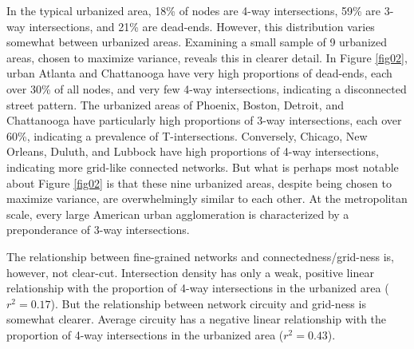 \documentclass{article}
\begin{document}
In the typical urbanized area, 18\% of nodes are 4-way intersections, 59\% are 3-way intersections, and 21\% are dead-ends. However, this distribution varies somewhat between urbanized areas. Examining a small sample of 9 urbanized areas, chosen to maximize variance, reveals this in clearer detail. In Figure \ref{fig02}, urban Atlanta and Chattanooga have very high proportions of dead-ends, each over 30\% of all nodes, and very few 4-way intersections, indicating a disconnected street pattern. The urbanized areas of Phoenix, Boston, Detroit, and Chattanooga have particularly high proportions of 3-way intersections, each over 60\%, indicating a prevalence of T-intersections. Conversely, Chicago, New Orleans, Duluth, and Lubbock have high proportions of 4-way intersections, indicating more grid-like connected networks. But what is perhaps most notable about Figure \ref{fig02} is that these nine urbanized areas, despite being chosen to maximize variance, are overwhelmingly similar to each other. At the metropolitan scale, every large American urban agglomeration is characterized by a preponderance of 3-way intersections.

The relationship between fine-grained networks and connectedness/grid-ness is, however, not clear-cut. Intersection density has only a weak, positive linear relationship with the proportion of 4-way intersections in the urbanized area ($r^{2}=0.17$). But the relationship between network circuity and grid-ness is somewhat clearer. Average circuity has a negative linear relationship with the proportion of 4-way intersections in the urbanized area ($r^{2}=0.43$).
\end{document}
